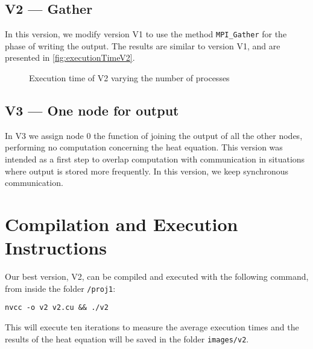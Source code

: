 \documentclass[conference]{IEEEtran}
\begin{document}
\subsection{V2 --- Gather}\label{sec:v2}
In this version, we modify version V1 to use the method \texttt{MPI\_Gather} for the phase of writing the output. The results are similar to version V1, and are presented in \autoref{fig:executionTimeV2}.


\begin{figure}[ht]
  \centering
  \caption{Execution time of V2 varying the number of processes}
  \label{fig:executionTimeV2}
\end{figure}

\subsection{V3 --- One node for output}
In V3 we assign node 0 the function of joining the output of all the other nodes, performing no computation concerning the heat equation. This version was intended as a first step to overlap computation with communication in situations where output is stored more frequently. In this version, we keep synchronous communication.


\section{Compilation and Execution Instructions}
Our best version, V2, can be compiled and executed with the following command, from inside the folder \texttt{/proj1}:
\begin{verbatim}
nvcc -o v2 v2.cu && ./v2
\end{verbatim}
This will execute ten iterations to measure the average execution times and the results of the heat equation will be saved in the folder \texttt{images/v2}.


\printbibliography
\end{document}
